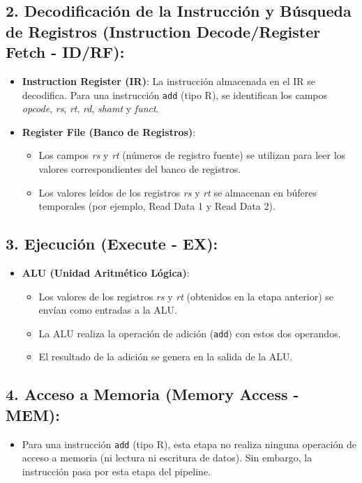 \documentclass{article}
\begin{document}
\subsection*{2. Decodificación de la Instrucción y Búsqueda de Registros (Instruction Decode/Register Fetch - ID/RF):}
\begin{itemize}
    \item \textbf{Instruction Register (IR)}: La instrucción almacenada en el IR se decodifica. Para una instrucción \texttt{add} (tipo R), se identifican los campos \textit{opcode}, \textit{rs}, \textit{rt}, \textit{rd}, \textit{shamt} y \textit{funct}.
    \item \textbf{Register File (Banco de Registros)}:
    \begin{itemize}
        \item Los campos \textit{rs} y \textit{rt} (números de registro fuente) se utilizan para leer los valores correspondientes del banco de registros.
        \item Los valores leídos de los registros \textit{rs} y \textit{rt} se almacenan en búferes temporales (por ejemplo, Read Data 1 y Read Data 2).
    \end{itemize}
\end{itemize}

\subsection*{3. Ejecución (Execute - EX):}
\begin{itemize}
    \item \textbf{ALU (Unidad Aritmético Lógica)}:
    \begin{itemize}
        \item Los valores de los registros \textit{rs} y \textit{rt} (obtenidos en la etapa anterior) se envían como entradas a la ALU.
        \item La ALU realiza la operación de adición (\texttt{add}) con estos dos operandos.
        \item El resultado de la adición se genera en la salida de la ALU.
    \end{itemize}
\end{itemize}

\subsection*{4. Acceso a Memoria (Memory Access - MEM):}
\begin{itemize}
    \item Para una instrucción \texttt{add} (tipo R), esta etapa no realiza ninguna operación de acceso a memoria (ni lectura ni escritura de datos). Sin embargo, la instrucción pasa por esta etapa del pipeline.
\end{itemize}
\end{document}
